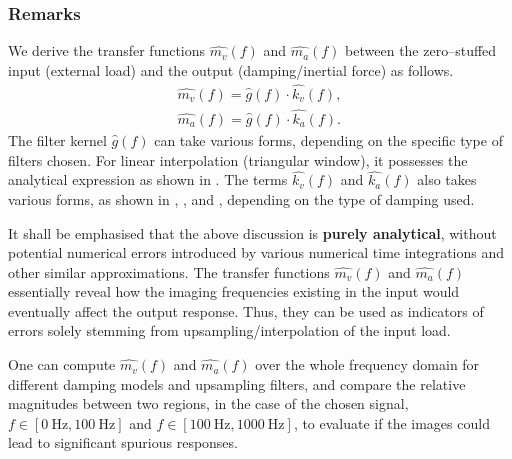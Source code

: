 \subsubsection{Remarks}
We derive the transfer functions $\hat{m_v}\left(f\right)$ and $\hat{m_a}\left(f\right)$ between the zero--stuffed input (external load) and the output (damping/inertial force) as follows.
\begin{gather}
\hat{m_v}\left(f\right)=\hat{g}\left(f\right)\cdot\hat{k_v}\left(f\right),\\
\hat{m_a}\left(f\right)=\hat{g}\left(f\right)\cdot\hat{k_a}\left(f\right).
\end{gather}
The filter kernel $\hat{g}\left(f\right)$ can take various forms, depending on the specific type of filters chosen. For linear interpolation (triangular window), it possesses the analytical expression as shown in . The terms $\hat{k_v}\left(f\right)$ and $\hat{k_a}\left(f\right)$ also takes various forms, as shown in , ,  and , depending on the type of damping used.

It shall be emphasised that the above discussion is \textbf{purely analytical}, without potential numerical errors introduced by various numerical time integrations and other similar approximations. The transfer functions $\hat{m_v}\left(f\right)$ and $\hat{m_a}\left(f\right)$ essentially reveal how the imaging frequencies existing in the input would eventually affect the output response. Thus, they can be used as indicators of errors solely stemming from upsampling/interpolation of the input load.

One can compute $\hat{m_v}\left(f\right)$ and $\hat{m_a}\left(f\right)$ over the whole frequency domain for different damping models and upsampling filters, and compare the relative magnitudes between two regions, in the case of the chosen signal, $f\in[\SI{0}{\hertz},\SI{100}{\hertz}]$ and $f\in[\SI{100}{\hertz},\SI{1000}{\hertz}]$, to evaluate if the images could lead to significant spurious responses.

